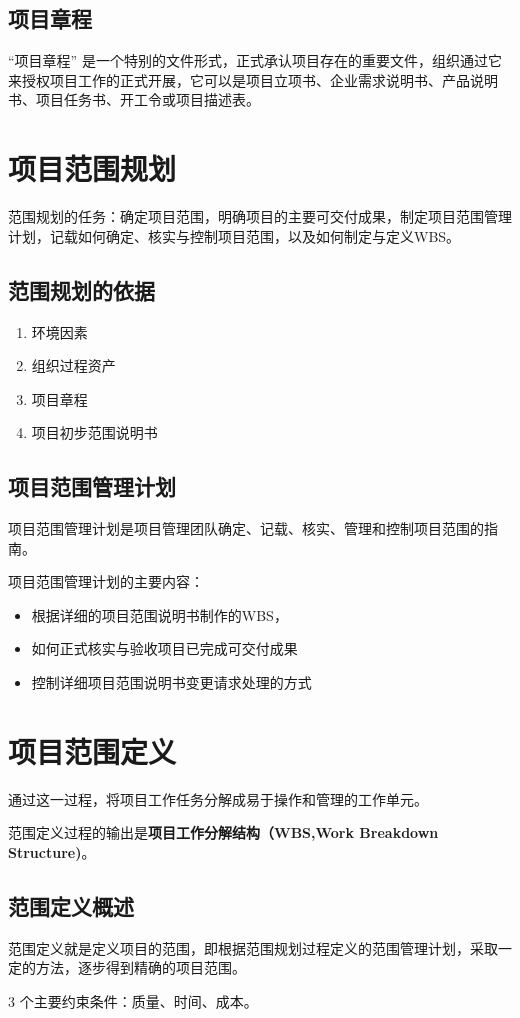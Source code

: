 \subsection{项目章程}
“项目章程” 是一个特别的文件形式，正式承认项目存在的重要文件，组织通过它来授权项目工作的正式开展，它可以是项目立项书、企业需求说明书、产品说明书、项目任务书、开工令或项目描述表。
\section{项目范围规划}
范围规划的任务：确定项目范围，明确项目的主要可交付成果，制定项目范围管理计划，记载如何确定、核实与控制项目范围，以及如何制定与定义WBS。
\subsection{范围规划的依据}
\begin{enumerate}
	\item 环境因素
	\item 组织过程资产
	\item 项目章程
	\item 项目初步范围说明书
\end{enumerate}
\subsection{项目范围管理计划}
项目范围管理计划是项目管理团队确定、记载、核实、管理和控制项目范围的指南。
\par 项目范围管理计划的主要内容：
\begin{itemize}
	\item 根据详细的项目范围说明书制作的WBS，
	\item 如何正式核实与验收项目已完成可交付成果
	\item 控制详细项目范围说明书变更请求处理的方式
\end{itemize}
\section{项目范围定义}
通过这一过程，将项目工作任务分解成易于操作和管理的工作单元。
\par 范围定义过程的输出是\textbf{项目工作分解结构（WBS,Work Breakdown Structure)}。
\subsection{范围定义概述}
范围定义就是定义项目的范围，即根据范围规划过程定义的范围管理计划，采取一定的方法，逐步得到精确的项目范围。
\par 3 个主要约束条件：质量、时间、成本。
